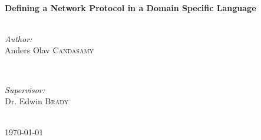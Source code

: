 \begin{titlepage}

\HRule \\[0.4cm]
{ \huge \bfseries Defining a Network Protocol in a Domain Specific Language}\\[0.4cm] %
\HRule \\[1.5cm]
 

\begin{minipage}{0.4\textwidth}
\begin{flushleft} \large
\emph{Author:}\\
Anders Olav \textsc{Candasamy} %
\end{flushleft}
\end{minipage}
~
\begin{minipage}{0.4\textwidth}
\begin{flushright} \large
\emph{Supervisor:} \\
Dr. Edwin \textsc{Brady} %

\end{flushright}
\end{minipage}\\[4cm]



{\large \today}\\[3cm] %


 

\vfill %
\end{titlepage}
\clearpage

